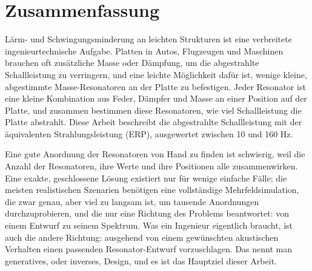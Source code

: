 \section*{Zusammenfassung}

Lärm- und Schwingungsminderung an leichten Strukturen ist eine verbreitete ingenieurtechnische Aufgabe. Platten in Autos, Flugzeugen und Maschinen brauchen oft zusätzliche Masse oder Dämpfung, um die abgestrahlte Schallleistung zu verringern, und eine leichte Möglichkeit dafür ist, wenige kleine, abgestimmte Masse-Resonatoren an der Platte zu befestigen. Jeder Resonator ist eine kleine Kombination aus Feder, Dämpfer und Masse an einer Position auf der Platte, und zusammen bestimmen diese Resonatoren, wie viel Schallleistung die Platte abstrahlt. Diese Arbeit beschreibt die abgestrahlte Schallleistung mit der äquivalenten Strahlungsleistung (ERP), ausgewertet zwischen 10 und 160 Hz.

Eine gute Anordnung der Resonatoren von Hand zu finden ist schwierig, weil die Anzahl der Resonatoren, ihre Werte und ihre Positionen alle zusammenwirken. Eine exakte, geschlossene Lösung existiert nur für wenige einfache Fälle; die meisten realistischen Szenarien benötigen eine vollständige Mehrfeldsimulation, die zwar genau, aber viel zu langsam ist, um tausende Anordnungen durchzuprobieren, und die nur eine Richtung des Problems beantwortet: von einem Entwurf zu seinem Spektrum. Was ein Ingenieur eigentlich braucht, ist auch die andere Richtung: ausgehend von einem gewünschten akustischen Verhalten einen passenden Resonator-Entwurf vorzuschlagen. Das nennt man generatives, oder inverses, Design, und es ist das Hauptziel dieser Arbeit.

